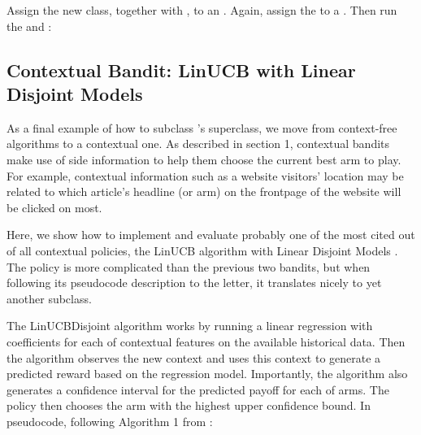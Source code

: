 \documentclass{jss}
\begin{document}
Assign the new class, together with , to an . Again, assign the  to a . Then run the  and :


\subsection{Contextual Bandit: LinUCB with Linear Disjoint Models} \label{linucbc}

As a final example of how to subclass 's  superclass, we move from context-free algorithms to a contextual one. As described in section 1, contextual bandits make use of side information to help them choose the current best arm to play. For example, contextual information such as a website visitors' location may be related to which article's headline (or arm) on the frontpage of the website will be clicked on most.

Here, we show how to implement and evaluate probably one of the most cited out of all contextual policies, the LinUCB algorithm with Linear Disjoint Models \cite{Li2010}. The policy is more complicated than the previous two bandits, but when following its pseudocode description to the letter, it translates nicely to yet another  subclass.

The LinUCBDisjoint algorithm works by running a linear regression with coefficients for each of  contextual features on the available historical data. Then the algorithm observes the new context and uses this context to generate a predicted reward based on the regression model. Importantly, the algorithm also generates a confidence interval for the predicted payoff for each of  arms. The policy then chooses the arm with the highest upper confidence bound. In pseudocode, following Algorithm 1 from \cite{Li2010}:
\end{document}
